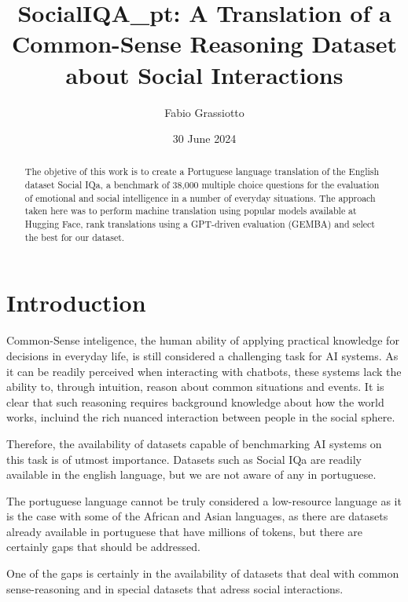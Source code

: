 \documentclass{article}
\title{SocialIQA\_pt: A Translation of a Common-Sense Reasoning Dataset about Social Interactions}
\author{Fabio Grassiotto}
\date{30 June 2024}
\begin{document}
\maketitle

\begin{abstract}
    The objetive of this work is to create a Portuguese language translation of
    the English dataset Social IQa, a benchmark of 38,000 multiple choice
    questions for the evaluation of emotional and social intelligence in a
    number of everyday situations. The approach taken here was to perform
    machine translation using popular models available at Hugging Face, rank
    translations using a GPT-driven evaluation (GEMBA) and select the best for
    our dataset.
\end{abstract}

\section{Introduction}

Common-Sense inteligence, the human ability of applying practical knowledge for
decisions in everyday life, is still considered a challenging task for AI
systems. As it can be readily perceived when interacting with chatbots, these
systems lack the ability to, through intuition, reason about common situations
and events. It is clear that such reasoning requires background knowledge about
how the world works, incluind the rich nuanced interaction between people in the
social sphere. \cite{choi2022curious, krause2023commonsense}

Therefore, the availability of datasets capable of benchmarking AI systems on
this task is of utmost importance. Datasets such as Social IQa are readily
available in the english language, but we are not aware of any in portuguese.
\cite{sap2019socialiqa}

The portuguese language cannot be truly considered a low-resource language as
it is the case with some of the African and Asian languages, as there are
datasets already available in portuguese that have millions of tokens, but there
are certainly gaps that should be addressed. \cite{ghafoor2021impact}

One of the gaps is certainly in the availability of datasets that deal with
common sense-reasoning and in special datasets that adress social interactions.
\end{document}

